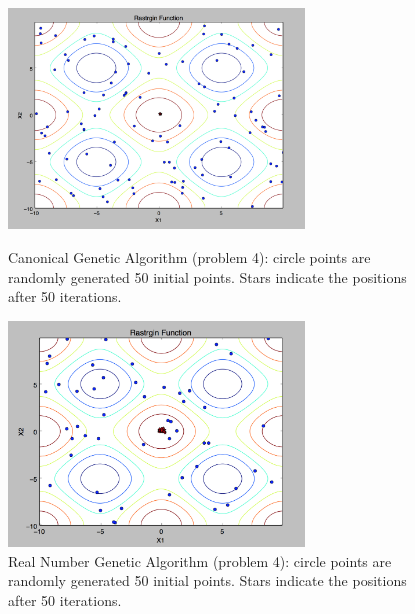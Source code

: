 \documentclass{article}
\begin{document}
\begin{figure} [h]
\includegraphics[width=0.7\textwidth]{GA_canonical}
\centering
\caption{Canonical Genetic Algorithm (problem 4): circle points are randomly generated 50 initial points. Stars indicate the positions after 50 iterations. }

\includegraphics[width=0.7\textwidth]{GA_real_number}
\centering
\caption{Real Number Genetic Algorithm (problem 4): circle points are randomly generated 50 initial points. Stars indicate the positions after 50 iterations. }

\end{figure}
\end{document}
